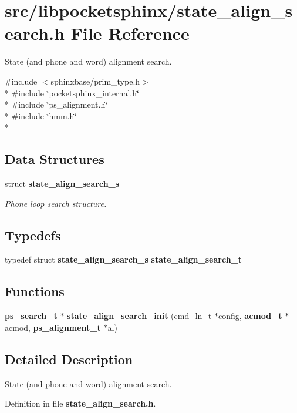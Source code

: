 \section{src/libpocketsphinx/state\-\_\-align\-\_\-search.h File Reference}
\label{state__align__search_8h}


State (and phone and word) alignment search.  


{\ttfamily \#include $<$sphinxbase/prim\-\_\-type.\-h$>$}\\*
{\ttfamily \#include \char`\"{}pocketsphinx\-\_\-internal.\-h\char`\"{}}\\*
{\ttfamily \#include \char`\"{}ps\-\_\-alignment.\-h\char`\"{}}\\*
{\ttfamily \#include \char`\"{}hmm.\-h\char`\"{}}\\*
\subsection*{Data Structures}
\begin{DoxyCompactItemize}
\item 
struct {\bf state\-\_\-align\-\_\-search\-\_\-s}
\begin{DoxyCompactList}\small\item\em Phone loop search structure. \end{DoxyCompactList}\end{DoxyCompactItemize}
\subsection*{Typedefs}
\begin{DoxyCompactItemize}
\item 
typedef struct {\bf state\-\_\-align\-\_\-search\-\_\-s} {\bfseries state\-\_\-align\-\_\-search\-\_\-t}\label{state__align__search_8h_a4559ae74ee038260ff66f432a7205aa8}

\end{DoxyCompactItemize}
\subsection*{Functions}
\begin{DoxyCompactItemize}
\item 
{\bf ps\-\_\-search\-\_\-t} $\ast$ {\bfseries state\-\_\-align\-\_\-search\-\_\-init} (cmd\-\_\-ln\-\_\-t $\ast$config, {\bf acmod\-\_\-t} $\ast$acmod, {\bf ps\-\_\-alignment\-\_\-t} $\ast$al)\label{state__align__search_8h_a7263b71e3838f0689963439c8b695e15}

\end{DoxyCompactItemize}


\subsection{Detailed Description}
State (and phone and word) alignment search. 

Definition in file {\bf state\-\_\-align\-\_\-search.\-h}.

